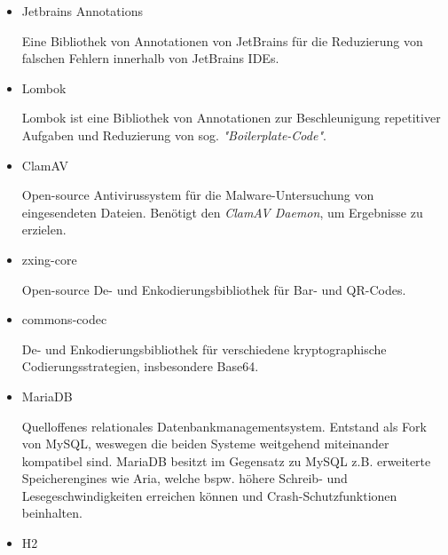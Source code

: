 \documentclass{article}
\begin{document}
\begin{itemize}
\item Jetbrains Annotations
\begin{itemize}
Eine Bibliothek von Annotationen von JetBrains für die Reduzierung von falschen Fehlern innerhalb von JetBrains IDEs.
\end{itemize}
\item Lombok
\begin{itemize}
Lombok ist eine Bibliothek von Annotationen zur Beschleunigung repetitiver Aufgaben und Reduzierung von sog. \textit{"Boilerplate-Code"}.
\end{itemize}
\item ClamAV
\begin{itemize}
Open-source Antivirussystem für die Malware-Untersuchung von eingesendeten Dateien. Benötigt den \textit{ClamAV Daemon}, um Ergebnisse zu erzielen.
\end{itemize}
\item zxing-core
\begin{itemize}
Open-source De- und Enkodierungsbibliothek für Bar- und QR-Codes.
\end{itemize}
\item commons-codec
\begin{itemize}
De- und Enkodierungsbibliothek für verschiedene kryptographische Codierungsstrategien, insbesondere Base64.
\end{itemize}
\break
\item MariaDB
\begin{itemize}
Quelloffenes relationales Datenbankmanagementsystem. Entstand als Fork von MySQL, weswegen die beiden Systeme weitgehend miteinander kompatibel sind. MariaDB besitzt im Gegensatz zu MySQL z.B. erweiterte Speicherengines wie Aria, welche bspw. höhere Schreib- und Lesegeschwindigkeiten erreichen können und Crash-Schutzfunktionen beinhalten.
\end{itemize}
\item H2
\end{itemize}
\end{document}
